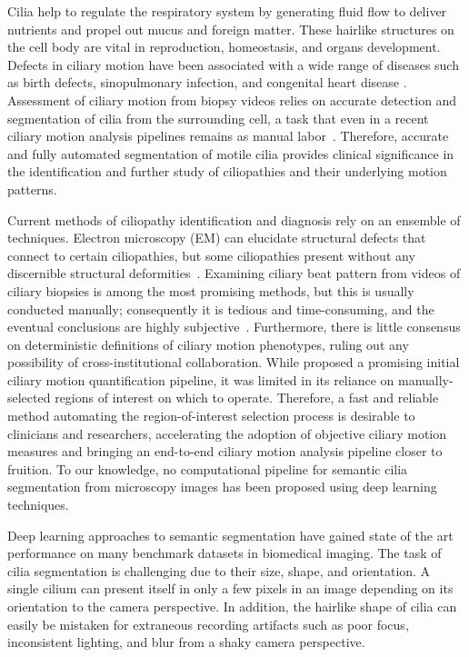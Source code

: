 \documentclass{llncs}
\begin{document}
Cilia help to regulate the respiratory system by generating fluid flow to deliver nutrients and propel out mucus and foreign matter. These hairlike structures on the cell body are vital in reproduction, homeostasis, and  organs development. Defects in ciliary motion have been associated with a wide range of diseases such as birth defects, sinopulmonary infection, and congenital heart disease \cite{Ciliopathy}. Assessment of ciliary motion from biopsy videos relies on accurate detection and segmentation of cilia from the surrounding cell, a task that even in a recent ciliary motion analysis pipelines remains as manual labor~\cite{QuinnSTM}. Therefore, accurate and fully automated segmentation of motile cilia provides clinical significance in the identification and further study of ciliopathies and their underlying motion patterns. 
\par 
Current methods of ciliopathy identification and diagnosis rely on an ensemble of techniques. Electron microscopy (EM) can elucidate structural defects that connect to certain ciliopathies, but some ciliopathies present without any discernible structural deformities~\cite{CiliaEM}. Examining ciliary beat pattern from videos of ciliary biopsies is among the most promising methods, but this is usually conducted manually; consequently it is tedious and time-consuming, and the eventual conclusions are highly subjective~\cite{CiliaCM}. Furthermore, there is little consensus on deterministic definitions of ciliary motion phenotypes, ruling out any possibility of cross-institutional collaboration. While \cite{QuinnSTM} proposed a promising initial ciliary motion quantification pipeline, it was limited in its reliance on manually-selected regions of interest on which to operate. Therefore, a fast and reliable method automating the region-of-interest selection process is desirable to clinicians and researchers, accelerating the adoption of objective ciliary motion measures and bringing an end-to-end ciliary motion analysis pipeline closer to fruition. To our knowledge, no computational pipeline for semantic cilia segmentation from microscopy images has been proposed using deep learning techniques. 
\par
Deep learning approaches to semantic segmentation have gained state of the art performance on many benchmark datasets in biomedical imaging. The task of cilia segmentation is challenging due to their size, shape, and orientation. A single cilium can present itself in only a few pixels in an image depending on its orientation to the camera perspective. In addition, the hairlike shape of cilia can easily be mistaken for extraneous recording artifacts such as poor focus, inconsistent lighting, and blur from a shaky camera perspective.
\end{document}
